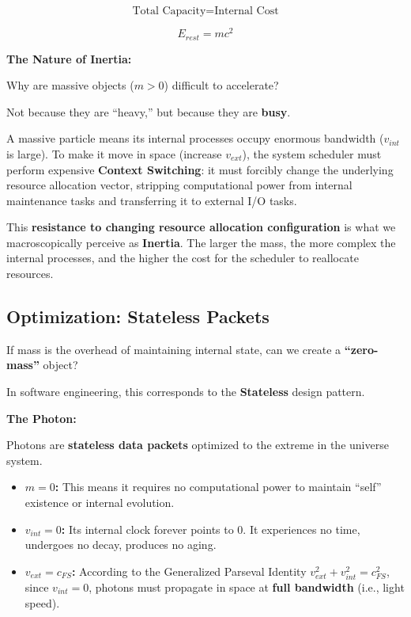 \documentclass[11pt,a4paper,twoside]{book}
\begin{document}
$$\text{Total Capacity} = \text{Internal Cost}$$

$$E_{rest} = m c^2$$

\textbf{The Nature of Inertia:}

Why are massive objects (\textbf{$m > 0$}) difficult to accelerate?

Not because they are ``heavy,'' but because they are \textbf{busy}.

A massive particle means its internal processes occupy enormous bandwidth (\textbf{$v_{int}$} is large). To make it move in space (increase \textbf{$v_{ext}$}), the system scheduler must perform expensive \textbf{Context Switching}: it must forcibly change the underlying resource allocation vector, stripping computational power from internal maintenance tasks and transferring it to external I/O tasks.

This \textbf{resistance to changing resource allocation configuration} is what we macroscopically perceive as \textbf{Inertia}. The larger the mass, the more complex the internal processes, and the higher the cost for the scheduler to reallocate resources.

\subsection{Optimization: Stateless Packets}

If mass is the overhead of maintaining internal state, can we create a \textbf{``zero-mass''} object?

In software engineering, this corresponds to the \textbf{Stateless} design pattern.

\textbf{The Photon:}

Photons are \textbf{stateless data packets} optimized to the extreme in the universe system.

\begin{itemize}
\item \textbf{$m = 0$:} This means it requires no computational power to maintain ``self'' existence or internal evolution.

\item \textbf{$v_{int} = 0$:} Its internal clock forever points to 0. It experiences no time, undergoes no decay, produces no aging.

\item \textbf{$v_{ext} = c_{FS}$:} According to the Generalized Parseval Identity \textbf{$v_{ext}^2 + v_{int}^2 = c_{FS}^2$}, since \textbf{$v_{int}=0$}, photons must propagate in space at \textbf{full bandwidth} (i.e., light speed).
\end{itemize}
\end{document}
